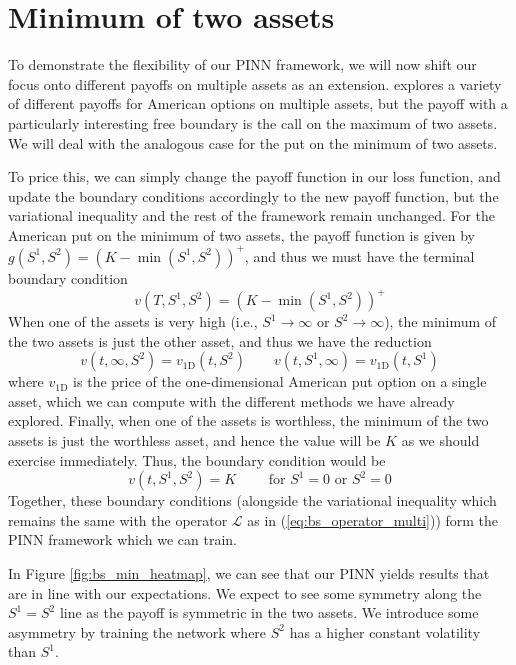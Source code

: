\section{Minimum of two assets}
To demonstrate the flexibility of our PINN framework, we will now shift our focus onto different payoffs on multiple assets as an extension. \cite{detemple2005american} explores a variety of different payoffs for American options on multiple assets, but the payoff with a particularly interesting free boundary is the call on the maximum of two assets. We will deal with the analogous case for the put on the minimum of two assets.

To price this, we can simply change the payoff function in our loss function, and update the boundary conditions accordingly to the new payoff function, but the variational inequality and the rest of the framework remain unchanged. For the American put on the minimum of two assets, the payoff function is given by $g\left(S^1, S^2\right) = \left(K - \min(S^1, S^2)\right)^+$, and thus we must have the terminal boundary condition
\begin{equation}
    v\left(T, S^1, S^2\right) = \left(K - \min(S^1, S^2)\right)^+
\end{equation}
When one of the assets is very high (i.e., $S^1 \to \infty$ or $S^2 \to \infty$), the minimum of the two assets is just the other asset, and thus we have the reduction
\begin{equation}
    v\left(t, \infty, S^2\right) = v_\text{1D}\left(t, S^2\right) \qquad v\left(t, S^1, \infty\right) = v_\text{1D}\left(t, S^1\right)
\end{equation}
where $v_\text{1D}$ is the price of the one-dimensional American put option on a single asset, which we can compute with the different methods we have already explored. Finally, when one of the assets is worthless, the minimum of the two assets is just the worthless asset, and hence the value will be $K$ as we should exercise immediately. Thus, the boundary condition would be
\begin{equation}
    v\left(t, S^1, S^2\right) = K \qquad \text{ for } S^1 = 0 \text{ or } S^2 = 0
\end{equation}
Together, these boundary conditions (alongside the variational inequality which remains the same with the operator $\mathcal L$ as in (\ref{eq:bs_operator_multi})) form the PINN framework which we can train.

In Figure \ref{fig:bs_min_heatmap}, we can see that our PINN yields results that are in line with our expectations. We expect to see some symmetry along the $S^1 = S^2$ line as the payoff is symmetric in the two assets. We introduce some asymmetry by training the network where $S^2$ has a higher constant volatility than $S^1$.

